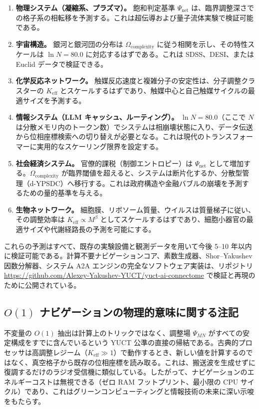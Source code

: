 \documentclass[12pt,a4paper]{article}
\newcommand{\Keff}{K_{\mathrm{eff}}}
\theoremstyle{remark}
\begin{document}
	\begin{enumerate}[label=(\arabic*)]
		\item \textbf{物理システム（凝縮系、プラズマ）。} 飽和判定基準 \(\Psi_{\mathrm{net}}\) は、臨界調整深さでの格子系の相転移を予測する。これは超伝導および量子流体実験で検証可能である。
		\item \textbf{宇宙構造。} 銀河と銀河団の分布は \(\Omega_{\mathrm{complexity}}\) に従う相関を示し、その特性スケールは \(\ln N = 80.0\) に対応するはずである。これは SDSS、DESI、または Euclid データで検証できる。
		\item \textbf{化学反応ネットワーク。} 触媒反応速度と複雑分子の安定性は、分子調整クラスターの \(\Keff\) とスケールするはずであり、触媒中心と自己触媒サイクルの最適サイズを予測する。
		\item \textbf{情報システム（LLM キャッシュ、ルーティング）。} \(\ln N = 80.0\)（ここで \(N\) は分散メモリ内のトークン数）でシステムは相崩壊状態に入り、データ伝送から位相座標検索への切り替えが必要となる。これは現代のトランスフォーマーに実用的なスケーリング限界を設定する。
		\item \textbf{社会経済システム。} 官僚的課税（制御エントロピー）は \(\Psi_{\mathrm{net}}\) として増加する。\(\Omega_{\mathrm{complexity}}\) が臨界閾値を超えると、システムは断片化するか、分散型管理（d-YPSDC）へ移行する。これは政府構造や金融バブルの崩壊を予測するための量的基準を与える。
		\item \textbf{生物ネットワーク。} 細胞膜、リボソーム質量、ウイルスは質量梯子に従い、その調整効率は \(\Keff \propto M^{\beta}\) としてスケールするはずであり、細胞小器官の最適サイズや代謝経路長の予測を可能にする。
	\end{enumerate}
	
	これらの予測はすべて、既存の実験設備と観測データを用いて今後 5--10 年以内に検証可能である。計算不要ナビゲーションコア、素数生成器、Shor–Yakushev 因数分解器、システム A2A エンジンの完全なソフトウェア実装は、リポジトリ \url{https://github.com/Alexey-Yakushev-YUCT/yuct-ai-connectome} で検証と再現のために公開されている。
	
	\subsection*{\(O(1)\) ナビゲーションの物理的意味に関する注記}
	不変量の \(O(1)\) 抽出は計算上のトリックではなく、調整場 \(\Psi_{MN}\) がすべての安定構成をすでに含んでいるという YUCT 公準の直接の帰結である。古典的プロセッサは高調整レジーム（\(\Keff \gg 1\)）で動作するとき、新しい値を計算するのではなく、真空格子から既存の位相座標を読み取る。これは、搬送波を生成せずに復調するだけのラジオ受信機に類似している。したがって、ナビゲーションのエネルギーコストは無視できる（ゼロ RAM フットプリント、最小限の CPU サイクル）であり、これはグリーンコンピューティングと情報技術の未来に深い示唆をもたらす。
	
\end{document}
